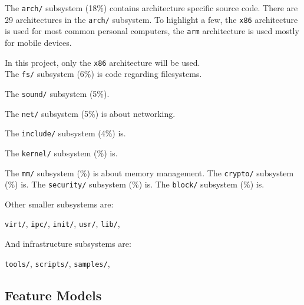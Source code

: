 \documentclass[a4paper,11pt]{report}
\newcommand{\figa}{
    \begin{figure}[!htpb]
    \centering
}
\newcommand{\figb}[2]{
    \caption{#1}
    \label{#2}
    \end{figure}
}
\begin{document}
The \texttt{arch/} subsystem (18\%) contains architecture specific source code. 
There are 29 architectures in the \texttt{arch/} subsystem. To highlight a few, 
the \texttt{x86} architecture is used for most common personal computers,
the \texttt{arm} architecture is used mostly for mobile devices.

In this project, only the \texttt{x86} architecture will be used.
\\

The \texttt{fs/} subsystem (6\%) is code regarding filesystems. 

The \texttt{sound/} subsystem (5\%).

The \texttt{net/} subsystem (5\%) is about networking.

The \texttt{include/} subsystem (4\%) is.

The \texttt{kernel/} subsystem (\%) is.

The \texttt{mm/} subsystem (\%) is about memory management.
The \texttt{crypto/} subsystem (\%) is.
The \texttt{security/} subsystem (\%) is.
The \texttt{block/} subsystem (\%) is.

Other smaller subsystems are:

\texttt{virt/},
\texttt{ipc/},
\texttt{init/},
\texttt{usr/},
\texttt{lib/},

And infrastructure subsystems are:

\texttt{tools/},
\texttt{scripts/},
\texttt{samples/},

        \subsection{Feature Models}
\end{document}
